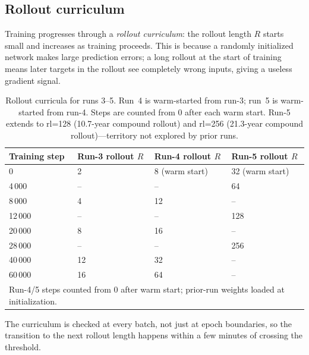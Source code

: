 \documentclass[11pt]{article}
\begin{document}
\subsection{Rollout curriculum}
\label{sec:curriculum}
Training progresses through a \emph{rollout curriculum}: the rollout length $R$
starts small and increases as training proceeds. This is because a randomly
initialized network makes large prediction errors; a long rollout at the start
of training means later targets in the rollout see completely wrong inputs,
giving a useless gradient signal.

\begin{table}[h]
\centering
\caption{Rollout curricula for runs 3--5. Run~4 is warm-started from run-3;
run~5 is warm-started from run-4. Steps are counted from 0 after each
warm start. Run-5 extends to rl=128 (10.7-year compound rollout) and
rl=256 (21.3-year compound rollout)---territory not explored by prior runs.}
\label{tab:curriculum}
\begin{tabular}{llll}
\toprule
Training step & Run-3 rollout $R$ & Run-4 rollout $R$ & Run-5 rollout $R$ \\
\midrule
0        & 2  & 8  (warm start) & 32 (warm start) \\
4\,000   & -- & -- & 64 \\
8\,000   & 4  & 12 & -- \\
12\,000  & -- & -- & 128 \\
20\,000  & 8  & 16 & -- \\
28\,000  & -- & -- & 256 \\
40\,000  & 12 & 32 & -- \\
60\,000  & 16 & 64 & -- \\
\midrule
\multicolumn{4}{l}{Run-4/5 steps counted from 0 after warm start; prior-run weights loaded at initialization.} \\
\bottomrule
\end{tabular}
\end{table}

The curriculum is checked at every batch, not just at epoch boundaries, so
the transition to the next rollout length happens within a few minutes of
crossing the threshold.
\end{document}
